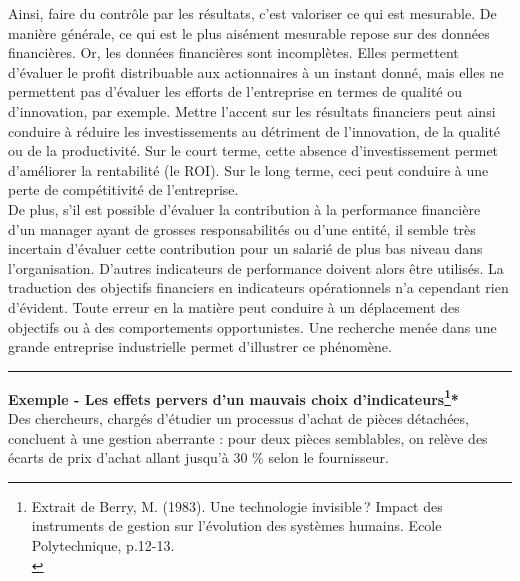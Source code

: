 \documentclass{kaobook}
\begin{document}
Ainsi, faire du contrôle par les résultats, c’est valoriser ce qui est mesurable. De manière générale, ce qui est le plus aisément mesurable repose sur des données financières. Or, les données financières sont incomplètes. Elles permettent d’évaluer le profit distribuable aux actionnaires à un instant donné, mais elles ne permettent pas d’évaluer les efforts de l’entreprise en termes de qualité ou d’innovation, par exemple. Mettre l’accent sur les résultats financiers peut ainsi conduire à réduire les investissements au détriment de l’innovation, de la qualité ou de la productivité. Sur le court terme, cette absence d’investissement permet d’améliorer la rentabilité (le ROI). Sur le long terme, ceci peut conduire à une perte de compétitivité de l’entreprise.\\

De plus, s’il est possible d’évaluer la contribution à la performance financière d’un manager ayant de grosses responsabilités ou d’une entité, il semble très incertain d’évaluer cette contribution pour un salarié de plus bas niveau dans l’organisation. D’autres indicateurs de performance doivent alors être utilisés. La traduction des objectifs financiers en indicateurs opérationnels n’a cependant rien d’évident. Toute erreur en la matière peut conduire à un déplacement des objectifs ou à des comportements opportunistes. Une recherche menée dans une grande entreprise industrielle permet d’illustrer ce phénomène.\\

\noindent\rule{\textwidth}{0.5pt}
\textbf{Exemple - Les effets pervers d'un mauvais choix d'indicateurs\footnote{Extrait de Berry, M. (1983). Une technologie invisible ? Impact des instruments de gestion sur l’évolution des systèmes humains. Ecole Polytechnique, p.12-13.\\}*}\\

Des chercheurs, chargés d’étudier un processus d’achat de pièces détachées, concluent à une gestion aberrante : pour deux pièces semblables, on relève des écarts de prix d’achat allant jusqu’à 30 \% selon le fournisseur.\\
\end{document}
